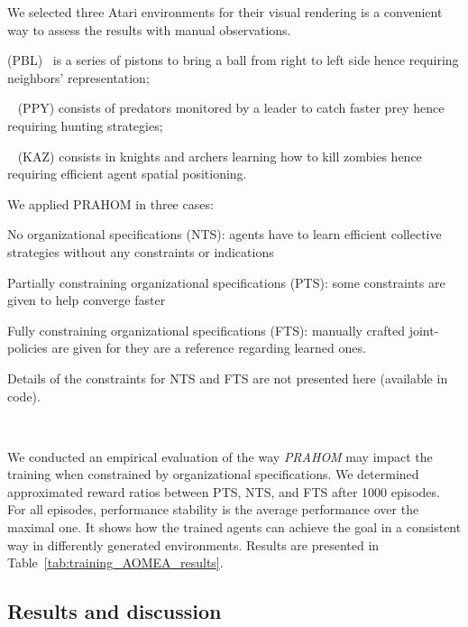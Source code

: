 \documentclass[runningheads]{llncs}
\begin{document}
We selected three Atari environments for their visual rendering is a convenient way to assess the results with manual observations\footnotemark[1].
\begin{enumerate*}[label=\roman*),itemjoin={;\quad}]
    \item {} (PBL)~\cite{Terry2021} is a series of pistons to bring a ball from right to left side hence requiring neighbors' representation;
    \item {}~\cite{Lowe2017} (PPY) consists of predators monitored by a leader to catch faster prey hence requiring hunting strategies;
    \item {}~\cite{Terry2021} (KAZ) consists in knights and archers learning how to kill zombies hence requiring efficient agent spatial positioning.
\end{enumerate*}
%
We applied PRAHOM in three cases:
\begin{enumerate*}[label=\roman*),itemjoin={;\quad}]
    \item No organizational specifications (NTS): agents have to learn efficient collective strategies without any constraints or indications
    \item Partially constraining organizational specifications (PTS): some constraints are given to help converge faster
    \item Fully constraining organizational specifications (FTS): manually crafted joint-policies are given for they are a reference regarding learned ones.
\end{enumerate*}
%
Details of the constraints for NTS and FTS are not presented here (available in code\footnotemark[1]).

\

We conducted an empirical evaluation of the way \emph{PRAHOM} may impact the training when constrained by organizational specifications. We determined approximated reward ratios between PTS, NTS, and FTS after 1000 episodes. For all episodes, performance stability is the average performance over the maximal one. It shows how the trained agents can achieve the goal in a consistent way in differently generated environments. Results are presented in Table~\ref{tab:training_AOMEA_results}.

\subsection{Results and discussion}
\end{document}
